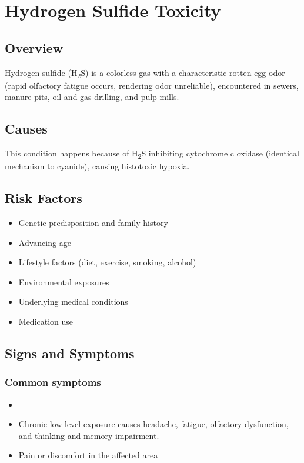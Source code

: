 \chapter{Hydrogen Sulfide Toxicity}
\label{sec:Hydrogen Sulfide Toxicity}

\section{Overview}
Hydrogen sulfide (H\textsubscript{2}S) is a colorless gas with a characteristic rotten egg odor (rapid olfactory fatigue occurs, rendering odor unreliable), encountered in sewers, manure pits, oil and gas drilling, and pulp mills.
\section{Causes}
This condition happens because of H\textsubscript{2}S inhibiting cytochrome c oxidase (identical mechanism to cyanide), causing histotoxic hypoxia.     
\section{Risk Factors}

\begin{itemize}[noitemsep]
  \item Genetic predisposition and family history
  \item Advancing age
  \item Lifestyle factors (diet, exercise, smoking, alcohol)
  \item Environmental exposures
  \item Underlying medical conditions
  \item Medication use
\end{itemize}
\section{Signs and Symptoms}

\subsection{Common symptoms}
\begin{itemize}[noitemsep]
  \item \item Chronic low-level exposure causes headache, fatigue, olfactory dysfunction, and thinking and memory impairment.

  \item Pain or discomfort in the affected area
  \end{itemize}

